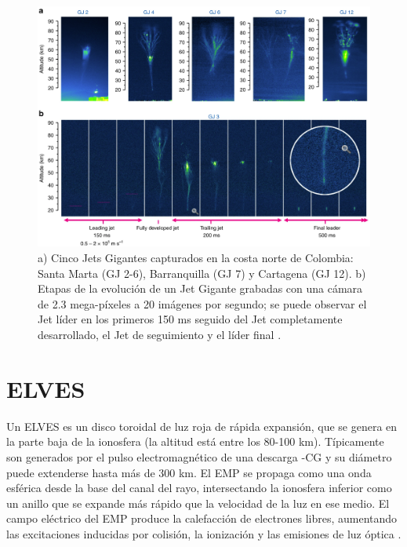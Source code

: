 \documentclass[12pt,oneside,openany,letter]{book}
\begin{document}
\begin{figure}
    \centering
    \includegraphics[scale=0.45]{figures/gigantic_jets_colombia.png}
    \caption[Jets Gigantes capturados en la costa norte de Colombia]{a) Cinco Jets Gigantes capturados en la costa norte de Colombia: Santa Marta (GJ 2-6), Barranquilla (GJ 7) y Cartagena (GJ 12). b) Etapas de la evolución de un Jet Gigante grabadas con una cámara de 2.3 mega-píxeles a 20 imágenes por segundo; se puede observar el Jet líder en los primeros 150 ms seguido del Jet completamente desarrollado, el Jet de seguimiento y el líder final \cite{VanEtal2019}.}
    \label{fig:gigantic_jets_colombia}
\end{figure}

\section{ELVES}
Un ELVES es un disco toroidal de luz roja de rápida expansión, que se genera en la parte baja de la ionosfera (la altitud está entre los 80-100 km). Típicamente son generados por el pulso electromagnético de una descarga -CG y su diámetro puede extenderse hasta más de 300 km. El EMP se propaga como una onda esférica desde la base del canal del rayo, intersectando la ionosfera inferior como un anillo que se expande más rápido que la velocidad de la luz en ese medio. El campo eléctrico del EMP produce la calefacción de electrones libres, aumentando las excitaciones inducidas por colisión, la ionización y las emisiones de luz óptica \cite{FullekrugEtal2006}.
\end{document}

